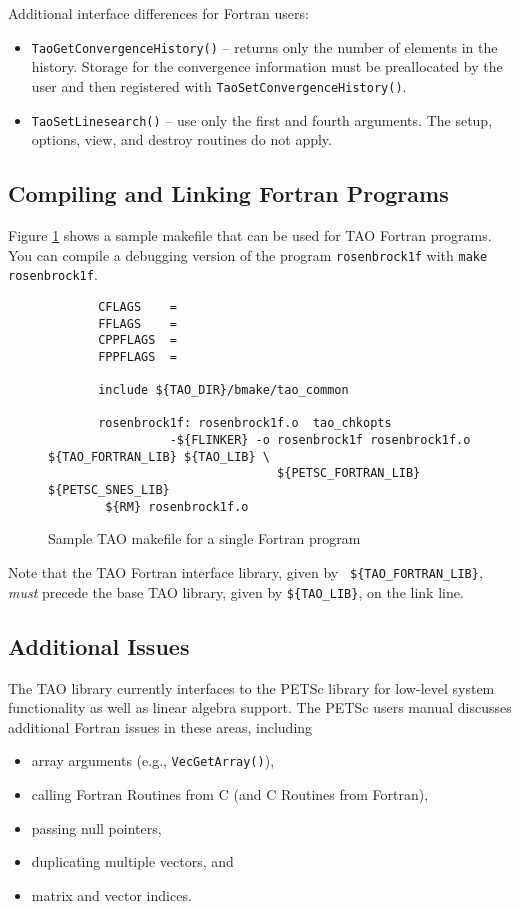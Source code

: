 Additional interface differences for Fortran users:
\begin{itemize}
\item \texttt{TaoGetConvergenceHistory()} -- returns only the number of 
elements in the history.  Storage for the convergence information must 
be preallocated by the user and then registered with 
\texttt{TaoSetConvergenceHistory()}.
\item \texttt{TaoSetLinesearch()} -- use only the first and fourth 
arguments. The setup, options, view, and destroy routines do not apply.
\end{itemize}

\subsection{Compiling and Linking Fortran Programs}
\label{sec:fortcompile}

Figure \ref{fig:make4} shows a sample makefile that can be used for
TAO Fortran programs.  You can compile a debugging
version of the program {\tt rosenbrock1f} with 
{\tt make rosenbrock1f}.

\begin{figure}[tbh]
{\footnotesize
\begin{verbatim}   
       CFLAGS    = 
       FFLAGS    = 
       CPPFLAGS  =
       FPPFLAGS  =
       
       include ${TAO_DIR}/bmake/tao_common
   
       rosenbrock1f: rosenbrock1f.o  tao_chkopts
                 -${FLINKER} -o rosenbrock1f rosenbrock1f.o ${TAO_FORTRAN_LIB} ${TAO_LIB} \
                                ${PETSC_FORTRAN_LIB} ${PETSC_SNES_LIB}
        ${RM} rosenbrock1f.o
\end{verbatim} %
\noindent
}
\caption{Sample TAO makefile for a single Fortran program}
\label{fig:make4}
\end{figure}

\noindent
Note that the TAO Fortran interface library, given by {\tt
\$\{TAO\_FORTRAN\_LIB\}}, {\em must}  precede
the base TAO library, given by {\tt \$\{TAO\_LIB\}}, \findex{TAO_LIB}
on the link line.

\subsection{Additional Issues}

The TAO library currently interfaces to the PETSc library for
low-level system functionality as well as linear algebra support.  The
PETSc users manual discusses additional Fortran issues in these areas,
including
\begin{itemize}
\item array arguments (e.g., {\tt VecGetArray()}),
\item calling Fortran Routines from C (and C Routines from Fortran),
\item passing null pointers,
\item duplicating multiple vectors, and
\item matrix and vector indices.
\end{itemize}


